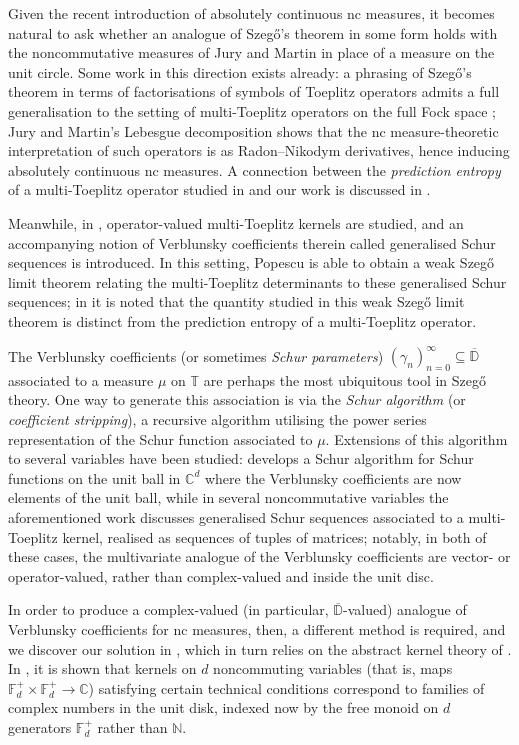 \documentclass[11pt,reqno]{amsart}
\def\g{\gamma}
\def\NN{\mathbb{N}}
\def\CC{\mathbb{C}}
\def\DD{\mathbb{D}}
\def\TT{\mathbb{T}}
\def\FF{\mathbb{F}}
\theoremstyle{definition}
\numberwithin{equation}{section}
\begin{document}
Given the recent introduction of absolutely continuous nc measures, it becomes natural to ask whether an analogue of Szeg\H{o}'s theorem in some form holds with the noncommutative measures of Jury and Martin in place of a measure on the unit circle. Some work in this direction exists already: a phrasing of Szeg\H{o}'s theorem in terms of factorisations of symbols of Toeplitz operators admits a full generalisation to the setting of multi-Toeplitz operators on the full Fock space \cite[Theorem 1.3]{Pop06}; Jury and Martin's Lebesgue decomposition \cite{JM22b} shows that the nc measure-theoretic interpretation of such operators is as Radon--Nikodym derivatives, hence inducing absolutely continuous nc measures. A connection between the \emph{prediction entropy} of a multi-Toeplitz operator studied in \cite{Pop06} and our work is discussed in .

Meanwhile, in \cite{Pop01}, operator-valued multi-Toeplitz kernels are studied, and an accompanying notion of Verblunsky coefficients therein called generalised Schur sequences is introduced. In this setting, Popescu is able to obtain a weak Szeg\H{o} limit theorem relating the multi-Toeplitz determinants to these generalised Schur sequences; in \cite{Pop06} it is noted that the quantity studied in this weak Szeg\H{o} limit theorem is distinct from the prediction entropy of a multi-Toeplitz operator.

The Verblunsky coefficients (or sometimes \emph{Schur parameters}) \((\g_n)_{n=0}^{\infty} \subseteq \overline{\DD}\) associated to a measure \(\mu\) on \(\TT\) are perhaps the most ubiquitous tool in Szeg\H{o} theory. One way to generate this association is via the \emph{Schur algorithm} (or \emph{coefficient stripping}), a recursive algorithm utilising the power series representation of the Schur function associated to \(\mu\). Extensions of this algorithm to several variables have been studied: \cite{ABK02} develops a Schur algorithm for Schur functions on the unit ball in \(\CC^d\) where the Verblunsky coefficients are now elements of the unit ball, while in several noncommutative variables the aforementioned work \cite{Pop01} discusses generalised Schur sequences associated to a multi-Toeplitz kernel, realised as sequences of tuples of matrices; notably, in both of these cases, the multivariate analogue of the Verblunsky coefficients are vector- or operator-valued, rather than complex-valued and inside the unit disc.

In order to produce a complex-valued (in particular, \(\overline{\DD}\)-valued) analogue of Verblunsky coefficients for nc measures, then, a different method is required, and we discover our solution in \cite{CJ02b}, which in turn relies on the abstract kernel theory of \cite{Con96}. In \cite{CJ02b}, it is shown that kernels on \(d\) noncommuting variables (that is, maps \(\FF_d^+ \times \FF_d^+ \to \CC\)) satisfying certain technical conditions correspond to families of complex numbers in the unit disk, indexed now by the free monoid on \(d\) generators \(\FF_d^+\) rather than \(\NN\). 
\end{document}
